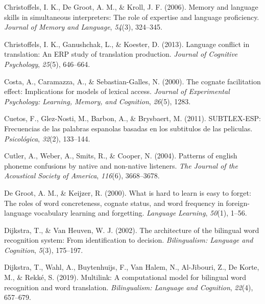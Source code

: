 \documentclass[
  english,
  man,floatsintext]{apa6}
\newlength{\cslhangindent}
\newenvironment{CSLReferences}[2] %
 {%
  \setlength{\parindent}{0pt}
  \ifodd #1 \everypar{\setlength{\hangindent}{\cslhangindent}}\ignorespaces\fi
  \ifnum #2 > 0
  \setlength{\parskip}{#2\baselineskip}
  \fi
 }%
 {}
\begin{document}
\begin{CSLReferences}{1}{0}
\leavevmode{}%
Christoffels, I. K., De Groot, A. M., \& Kroll, J. F. (2006). Memory and language skills in simultaneous interpreters: The role of expertise and language proficiency. \emph{Journal of Memory and Language}, \emph{54}(3), 324--345.

\leavevmode{}%
Christoffels, I. K., Ganushchak, L., \& Koester, D. (2013). Language conflict in translation: An ERP study of translation production. \emph{Journal of Cognitive Psychology}, \emph{25}(5), 646--664.

\leavevmode{}%
Costa, A., Caramazza, A., \& Sebastian-Galles, N. (2000). The cognate facilitation effect: Implications for models of lexical access. \emph{Journal of Experimental Psychology: Learning, Memory, and Cognition}, \emph{26}(5), 1283.

\leavevmode{}%
Cuetos, F., Glez-Nosti, M., Barbon, A., \& Brysbaert, M. (2011). SUBTLEX-ESP: Frecuencias de las palabras espanolas basadas en los subtitulos de las peliculas. \emph{Psicol{ó}gica}, \emph{32}(2), 133--144.

\leavevmode{}%
Cutler, A., Weber, A., Smits, R., \& Cooper, N. (2004). Patterns of english phoneme confusions by native and non-native listeners. \emph{The Journal of the Acoustical Society of America}, \emph{116}(6), 3668--3678.

\leavevmode{}%
De Groot, A. M., \& Keijzer, R. (2000). What is hard to learn is easy to forget: The roles of word concreteness, cognate status, and word frequency in foreign-language vocabulary learning and forgetting. \emph{Language Learning}, \emph{50}(1), 1--56.

\leavevmode{}%
Dijkstra, T., \& Van Heuven, W. J. (2002). The architecture of the bilingual word recognition system: From identification to decision. \emph{Bilingualism: Language and Cognition}, \emph{5}(3), 175--197.

\leavevmode{}%
Dijkstra, T., Wahl, A., Buytenhuijs, F., Van Halem, N., Al-Jibouri, Z., De Korte, M., \& Rekké, S. (2019). Multilink: A computational model for bilingual word recognition and word translation. \emph{Bilingualism: Language and Cognition}, \emph{22}(4), 657--679.


\end{CSLReferences}
\end{document}
